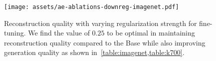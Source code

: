 \begin{figure}[ht]
\centering
\texttt{[image: assets/ae-ablations-downreg-imagenet.pdf]}
\vspace{-0.5cm}
\caption{Reconstruction quality with varying \regshortname regularization strength for fine-tuning. We find the value of $0.25$ to be optimal in maintaining reconstruction quality compared to the Base while also improving generation quality as shown in~\cref{table:imagenet,table:k700}.}
\label{fig:ablations-downreg}
\end{figure}
